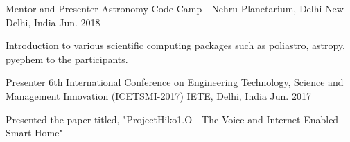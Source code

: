 


\begin{cventries}


\cventry
{Mentor and Presenter} %
{Astronomy Code Camp - Nehru Planetarium, Delhi} %
{New Delhi, India} %
{Jun. 2018} %
{ %
\begin{cvitems}
\item {Introduction to various scientific computing packages such as poliastro, astropy, pyephem to the participants.}
\end{cvitems}
}


\cventry
{Presenter} %
{6th International Conference on Engineering Technology, Science and Management Innovation (ICETSMI-2017)} %
{IETE, Delhi, India} %
{Jun. 2017} %
{ %
\begin{cvitems}
\item {Presented the paper titled, "ProjectHiko1.O - The Voice and Internet Enabled Smart Home"}
\end{cvitems}
}


\end{cventries}